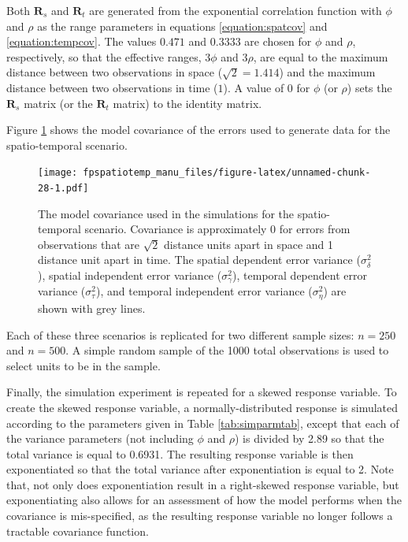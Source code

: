 \documentclass[]{interact}
\theoremstyle{plain}%
\theoremstyle{definition}
\theoremstyle{remark}
\begin{document}
Both \(\mathbf{R}_{s}\) and \(\mathbf{R}_t\) are generated from the
exponential correlation function with \(\phi\) and \(\rho\) as the range
parameters in equations \ref{equation:spatcov} and
\ref{equation:tempcov}. The values \(0.471\) and \(0.3333\) are chosen
for \(\phi\) and \(\rho\), respectively, so that the effective ranges,
\(3 \phi\) and \(3 \rho\), are equal to the maximum distance between two
observations in space (\(\sqrt2 = 1.414\)) and the maximum distance
between two observations in time (\(1\)). A value of 0 for \(\phi\) (or
\(\rho\)) sets the \(\mathbf{R}_{s}\) matrix (or the \(\mathbf{R}_t\)
matrix) to the identity matrix.

Figure \ref{fig:simcovplot} shows the model covariance of the errors
used to generate data for the spatio-temporal scenario.

\begin{figure}
\centering
\texttt{[image: fpspatiotemp\_manu\_files/figure-latex/unnamed-chunk-28-1.pdf]}
\caption{\label{fig:simcovplot} The model covariance used in the
simulations for the spatio-temporal scenario. Covariance is
approximately 0 for errors from observations that are \(\sqrt2\)
distance units apart in space and 1 distance unit apart in time. The
spatial dependent error variance (\(\sigma^2_{\delta}\)), spatial
independent error variance (\(\sigma^2_{\gamma}\)), temporal dependent
error variance (\(\sigma^2_{\tau}\)), and temporal independent error
variance (\(\sigma^2_{\eta}\)) are shown with grey lines.}
\end{figure}

Each of these three scenarios is replicated for two different sample
sizes: \(n = 250\) and \(n = 500\). A simple random sample of the 1000
total observations is used to select units to be in the sample.

Finally, the simulation experiment is repeated for a skewed response
variable. To create the skewed response variable, a normally-distributed
response is simulated according to the parameters given in Table
\ref{tab:simparmtab}, except that each of the variance parameters (not
including \(\phi\) and \(\rho\)) is divided by 2.89 so that the total
variance is equal to 0.6931. The resulting response variable is then
exponentiated so that the total variance after exponentiation is equal
to 2. Note that, not only does exponentiation result in a right-skewed
response variable, but exponentiating also allows for an assessment of
how the model performs when the covariance is mis-specified, as the
resulting response variable no longer follows a tractable covariance
function.
\end{document}
